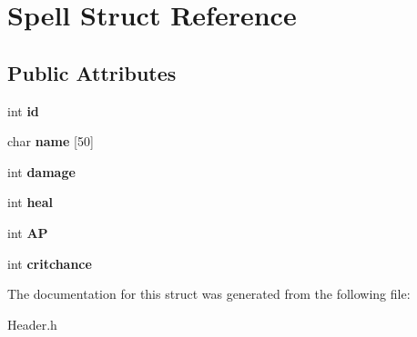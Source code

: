 \hypertarget{structSpell}{}\section{Spell Struct Reference}
\label{structSpell}
\subsection*{Public Attributes}
\begin{DoxyCompactItemize}
\item 
int {\bfseries id}\hypertarget{structSpell_a1326be69cf181af817be2848680d12e7}{}\label{structSpell_a1326be69cf181af817be2848680d12e7}

\item 
char {\bfseries name} \mbox{[}50\mbox{]}\hypertarget{structSpell_a02a908f6bb055b1220ff2c2526286a78}{}\label{structSpell_a02a908f6bb055b1220ff2c2526286a78}

\item 
int {\bfseries damage}\hypertarget{structSpell_a375d0e94137a43f4ffd761dfe6ab0c3f}{}\label{structSpell_a375d0e94137a43f4ffd761dfe6ab0c3f}

\item 
int {\bfseries heal}\hypertarget{structSpell_a759e8ee282eb0c06d6bdade83ec4c0fa}{}\label{structSpell_a759e8ee282eb0c06d6bdade83ec4c0fa}

\item 
int {\bfseries AP}\hypertarget{structSpell_aeb47cca9bf674355e767e6b3b20674f8}{}\label{structSpell_aeb47cca9bf674355e767e6b3b20674f8}

\item 
int {\bfseries critchance}\hypertarget{structSpell_a2febe0d6e9c46148d392bb357d52ee7b}{}\label{structSpell_a2febe0d6e9c46148d392bb357d52ee7b}

\end{DoxyCompactItemize}


The documentation for this struct was generated from the following file\+:\begin{DoxyCompactItemize}
\item 
Header.\+h\end{DoxyCompactItemize}
